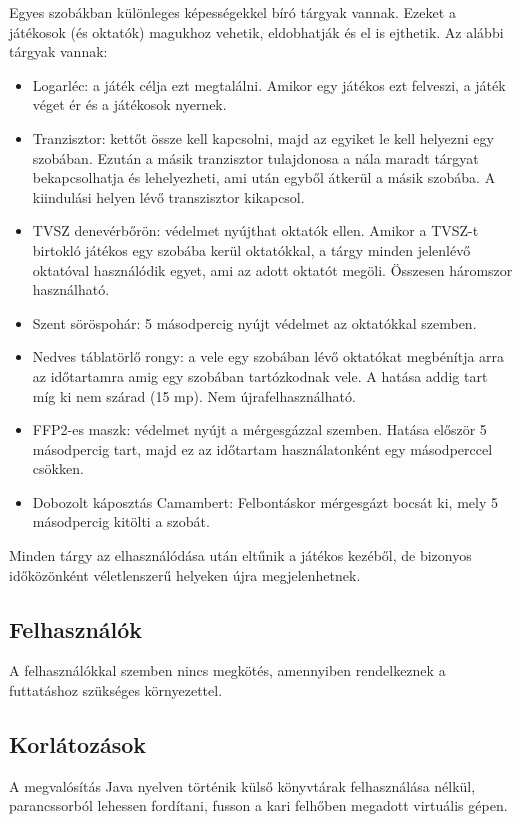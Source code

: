 Egyes szobákban különleges képességekkel bíró tárgyak vannak. Ezeket a játékosok (és oktatók) magukhoz vehetik, eldobhatják és el is ejthetik. Az alábbi tárgyak vannak: 
\begin{itemize}
    \item Logarléc: a játék célja ezt megtalálni. Amikor egy játékos ezt felveszi, a játék véget ér és a játékosok nyernek.
    \item Tranzisztor: kettőt össze kell kapcsolni, majd az egyiket le kell helyezni egy szobában. Ezután a másik tranzisztor tulajdonosa a nála maradt tárgyat bekapcsolhatja és lehelyezheti, ami után egyből átkerül a másik szobába. A kiindulási helyen lévő transzisztor kikapcsol.
    \item TVSZ denevérbőrön: védelmet nyújthat oktatók ellen. Amikor a TVSZ-t birtokló játékos egy szobába kerül oktatókkal, a tárgy minden jelenlévő oktatóval használódik egyet, ami az adott oktatót megöli. Összesen háromszor használható.
    \item Szent söröspohár: 5 másodpercig nyújt védelmet az oktatókkal szemben.
    \item Nedves táblatörlő rongy: a vele egy szobában lévő oktatókat megbénítja arra az időtartamra amig egy szobában tartózkodnak vele. A hatása addig tart míg ki nem szárad (15 mp). Nem újrafelhasználható.
    \item FFP2-es maszk: védelmet nyújt a mérgesgázzal szemben. Hatása először 5 másodpercig tart, majd  ez az időtartam használatonként egy másodperccel csökken.
    \item Dobozolt káposztás Camambert: Felbontáskor mérgesgázt bocsát ki, mely 5 másodpercig kitölti a szobát.
\end{itemize}

Minden tárgy az elhasználódása után eltűnik a játékos kezéből, de bizonyos időközönként véletlenszerű helyeken újra megjelenhetnek.

\subsection{Felhasználók}

A felhasználókkal szemben nincs megkötés, amennyiben rendelkeznek a futtatáshoz szükséges környezettel.

\subsection{Korlátozások}

A megvalósítás Java nyelven történik külső könyvtárak felhasználása nélkül, parancssorból lehessen fordítani, fusson a kari felhőben megadott virtuális gépen.

